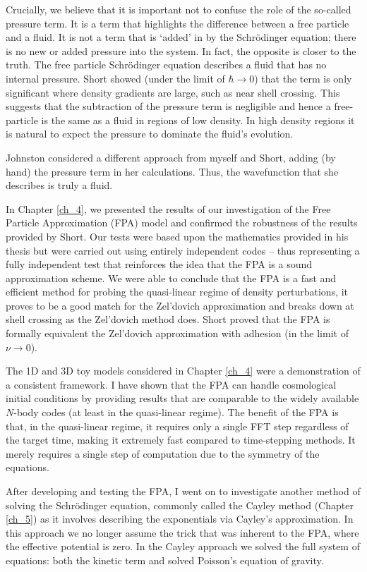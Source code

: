 Crucially, we believe that it is important not to confuse the role of the so-called pressure term. It is a term that highlights the difference between a free particle and a fluid. It is not a term that is `added' in by the Schr\"odinger equation; there is no new or added pressure into the system. In fact, the opposite is closer to the truth. The free particle Schr\"odinger equation describes a fluid that has no internal pressure. Short showed (under the limit of $\hbar \rightarrow 0$) that the term is only significant where density gradients are large, such as near shell crossing. This suggests that the subtraction of the pressure term is negligible and hence a free-particle is the same as a fluid in regions of low density. In high density regions it is natural to expect the pressure to dominate the fluid's evolution.

Johnston considered a different approach from myself and Short, adding (by hand) the pressure term in her calculations. Thus, the wavefunction that she describes is truly a fluid.

In Chapter \ref{ch_4}, we presented the results of our investigation of the Free Particle Approximation (FPA) model and confirmed the robustness of the results provided by Short. Our tests were based upon the mathematics provided in his thesis but were carried out using entirely independent codes -- thus representing a fully independent test that reinforces the idea that the FPA is a sound approximation scheme. We were able to conclude that the FPA is a fast and efficient method for probing the quasi-linear regime of density perturbations, it proves to be a good match for the Zel'dovich approximation and breaks down at shell crossing as the Zel'dovich method does. Short proved that the FPA is formally equivalent the Zel'dovich approximation with adhesion (in the limit of $\nu \rightarrow 0$).

The 1D and 3D toy models considered in Chapter \ref{ch_4} were a demonstration of a consistent framework. I have shown that the FPA can handle cosmological initial conditions by providing results that are comparable to the widely available $N$-body codes (at least in the quasi-linear regime). The benefit of the FPA is that, in the quasi-linear regime, it requires only a single FFT step regardless of the target time, making it extremely fast compared to time-stepping methods. It merely requires a single step of computation due to the symmetry of the equations.

After developing and testing the FPA, I went on to investigate another method of solving the Schr\"odinger equation, commonly called the Cayley method (Chapter \ref{ch_5}) as it involves describing the exponentials via Cayley's approximation. In this approach we no longer assume the trick that was inherent to the FPA, where the effective potential is zero. In the Cayley approach we solved the full system of equations: both the kinetic term and solved Poisson's equation of gravity.

